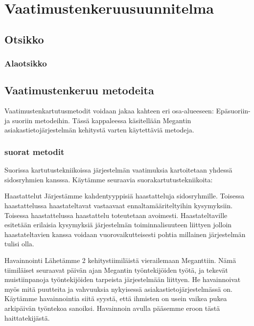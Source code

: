 \chapter{Vaatimustenkeruusuunnitelma} %
\label{keruu} %
\thispagestyle{fancy} %

\lipsum[1]

\section{Otsikko}  %

\lipsum

\subsection{Alaotsikko}

\lipsum[1-3]





\section{Vaatimustenkeruu metodeita}
Vaatimustenkartutusmetodit voidaan jakaa kahteen eri osa-alueeseen: Epäsuoriin- ja suoriin metodeihin.
 Tässä kappaleessa käsitellään Megantin asiakastietojärjestelmän kehitystä varten käytettäviä metodeja.


 \subsection{suorat metodit}
 Suorissa kartutustekniikoissa järjestelmän vaatimuksia kartoitetaan yhdessä sidosryhmien kansssa.
 Käytämme seuraavia suorakartutustekniikoita:

 Haastattelut
 Järjestämme kahdentyyppisiä haastatteluja sidosryhmille. Toisessa haastattelussa haastateltavat vastaavaat ennaltamääriteltyihin kysymyksiin. 
 Toisessa haastattelussa haastattelu toteutetaan avoimesti. Haastateltaville esitetään erilaisia kysymyksiä järjestelmän toiminnalisuuteen liittyen jolloin
 haastateltavien kanssa voidaan vuorovaikutteisesti pohtia millainen järjestelmän tulisi olla.

Havainnointi
Lähetämme 2 kehitystiimiläistä vierailemaan  Meganttiin. Nämä tiimiläiset seuraavat päivän ajan Megantin työntekijöiden työtä, ja tekevät 
muistiinpanoja työntekijöiden tarpeista järjestelmään liittyen. He havainnoivat myös mitä puutteita ja vahvuuksia nykyisessä asiakastietojärjestelmässä on.
Käytämme havainnointia siitä syystä, että ihmisten on usein vaikea pukea arkipäivän työntekoa sanoiksi. Havainnoin avulla pääsemme eroon tästä haittatekijästä.


